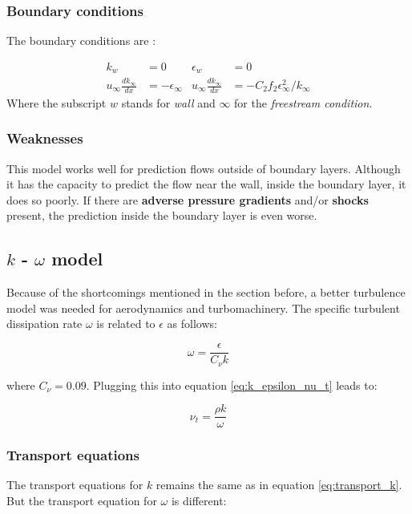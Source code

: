 \subsubsection{Boundary conditions}
The boundary conditions are \cite{JONES1972301}:

\begin{align*}
    k_{w}        &= 0       &\epsilon_{w} &= 0 \\
    u_{\infty} \frac{d k_{\infty}}{d x}  &= - \epsilon_{\infty}
    & u_{\infty} \frac{d k_{\infty}}{d x} &= 
    - C_2 f_2 \epsilon_{\infty}^2 / k_{\infty}
\end{align*}
\noindent Where the subscript $w$ stands for \textit{wall} and $\infty$ for the
\textit{freestream condition}.


\subsubsection{Weaknesses}
This model works well for prediction flows outside of boundary layers. Although
it has the capacity to predict the flow near the wall, inside the boundary
layer, it does so poorly. If there are \textbf{adverse pressure gradients}
and/or \textbf{shocks} present, the prediction inside the boundary layer is
even worse. \cite{cfd101_k-epsilon}




\subsection{$k$ - $\omega$ model}
Because of the shortcomings mentioned in the section before, a better
turbulence model was needed for aerodynamics and turbomachinery. The specific
turbulent dissipation rate $\omega$ is related to $\epsilon$ as follows:

\begin{equation}
    \omega = \frac{\epsilon}{C_{\nu} k}
\end{equation}

\noindent where $C_{\nu} = 0.09$. Plugging this into equation
\ref{eq:k_epsilon_nu_t} leads to:

\begin{equation}
    \nu_t = \frac{\rho k}{\omega}
\end{equation}


\subsubsection{Transport equations}
The transport equations for $k$ remains the same as in equation
\ref{eq:transport_k}. But the transport equation for $\omega$ is different:

